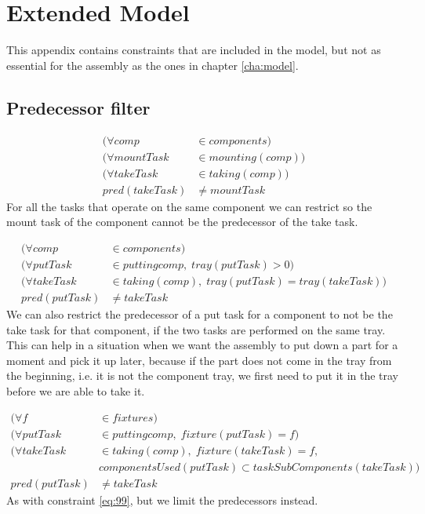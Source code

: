  \chapter{Extended Model}
This appendix contains constraints that are included in the model, but not as essential for the assembly as the ones in chapter \ref{cha:model}.

\section{Predecessor filter}
 \begin{equation}
  \begin{aligned}\label{eq:85}
  (\forall comp &\in components) \\
  (\forall mountTask &\in mounting(comp)) \\
  (\forall takeTask &\in taking(comp)) \\
  pred(takeTask) &\neq mountTask
  \end{aligned}
  \end{equation}
  For all the tasks that operate on the same component we can restrict so the mount task of the component cannot be the predecessor of the take task. 
  
  \begin{equation}
  \begin{aligned}\label{eq:86}
  (\forall comp &\in components) \\
  (\forall putTask &\in putting{comp}, \; tray(putTask) > 0) \\
  (\forall takeTask &\in taking(comp), \; tray(putTask) = tray(takeTask)) \\
  pred(putTask) &\neq takeTask
  \end{aligned}
  \end{equation}
  We can also restrict the predecessor of a put task for a component to not be the take task for that component, if the two tasks are performed on the same tray. This can help in a situation when we want the assembly to put down a part for a moment and pick it up later, because if the part does not come in the tray from the beginning, i.e. it is not the component tray, we first need to put it in the tray before we are able to take it. 
  
  \begin{equation}
  \begin{aligned}\label{eq:87}
  (\forall f &\in fixtures) \\
  (\forall putTask &\in putting{comp}, \; fixture(putTask) = f) \\
  (\forall takeTask &\in taking(comp), \; fixture(takeTask) = f,\\
  &componentsUsed(putTask) \subset taskSubComponents(takeTask))\\
  pred(putTask) &\neq takeTask
  \end{aligned}
  \end{equation}
  As with constraint \ref{eq:99}, but we limit the predecessors instead.
  
